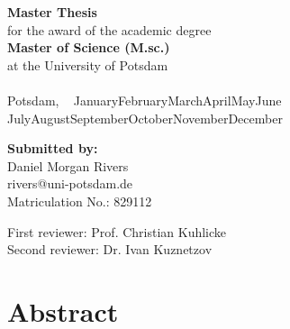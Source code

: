 \documentclass[12pt,a4paper]{article}
\makeatletter
\newcommand{\ThesisTitle}{\TITLE}
\newcommand{\AuthorName}{Daniel Morgan Rivers}
\newcommand{\AuthorAddressTwo}{Berlin, Germany 10559}
\newcommand{\AuthorEmail}{rivers@uni-potsdam.de}
\newcommand{\MatricNo}{829112}
\newcommand{\FirstReviewer}{Prof. Christian Kuhlicke}
\newcommand{\SecondReviewer}{Dr. Ivan Kuznetzov}
\newcommand{\MonthName}{%
  \ifcase\month
  \or January\or February\or March\or April\or May\or June%
  \or July\or August\or September\or October\or November\or December%
  \fi
}
\newcommand{\DateDDMonthYYYY}{\number\day~\MonthName~\number\year}
\makeatother
\begin{document}
\begin{center}
\begin{center}
        {\large \textbf{Master Thesis}}\\
        for the award of the academic degree\\
        \textbf{Master of Science (M.sc.)}\\
        at the University of Potsdam\\[3em]
    
        \textbf{\LARGE \ThesisTitle}\\ [3em] %
    
        Potsdam, \DateDDMonthYYYY \\[9em]
    
        \begin{flushleft}
            \textbf{Submitted by:}\\[-0.2em]
            \AuthorName\\
            \AuthorEmail\\
            Matriculation No.: \MatricNo

            First reviewer: \FirstReviewer\\
            Second reviewer: \SecondReviewer
        \end{flushleft}

    \end{center}
    \clearpage

\end{center}
\clearpage
\section*{Abstract}
\end{document}
